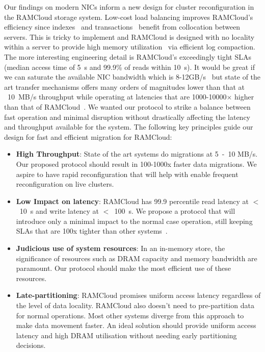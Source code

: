 Our findings on modern NICs inform a new design for cluster reconfiguration
in the RAMCloud storage system. Low-cost load balancing improves RAMCloud’s
efficiency since indexes~\cite{slik} and transactions~\cite{ramcloudtx} benefit from collocation between servers.
This is tricky to implement and RAMCloud is designed with no locality within a 
server to provide high memory utilization~\cite{ramcloudfast} via efficient log compaction.
The more interesting engineering detail is RAMCloud’s exceedingly tight SLAs (median
access time of 5~\textmu s and 99.9\% of reads within 10~\textmu s). It would be great if we can saturate the
available NIC bandwidth which is 8-12GB/s~\cite{cx3,cx4} but state of the art 
transfer mechanisms offers many orders of magnitudes lower than that at ~10~MB/s 
throughput while operating at latencies that are 1000-10000$\times$ higher than that of RAMCloud~\cite{ramcloud}.
We wanted our protocol to strike a balance between fast operation and minimal disruption without drastically affecting
the latency and throughput available for the system. The following key principles guide our design for fast and 
efficient migration for RAMCloud:
\begin{itemize}
\item{\textbf{High Throughput}}: State of the art systems do migrations at 5~-~10 MB/s. Our proposed protocol
should result in 100-1000x faster data migrations. We aspire to have rapid reconfiguration that will 
help with enable frequent reconfiguration on live clusters.
\item{\textbf{Low Impact on latency}}: RAMCloud has 99.9 percentile read latency at $<$~10~\textmu s \linebreak and write latency
at $<$~100~\textmu s. We propose a protocol that will introduce only a minimal impact to the normal case operation, still keeping
SLAs that are 100x tighter \linebreak than other systems~\cite{squall}.
\item{\textbf{Judicious use of system resources}}: In an in-memory store, the significance of \linebreak resources such as DRAM capacity and
memory bandwidth are paramount. Our \linebreak protocol should make the most efficient use of these resources.
\item{\textbf{Late-partitioning}}: RAMCloud promises uniform access latency regardless of the level of data locality.
RAMCloud also doesn't need to pre-partition data for normal operations. Most other systems diverge from this 
approach to make data movement faster. An ideal solution should provide uniform access latency and high DRAM utilisation 
without needing early partitioning decisions.
\end{itemize}

